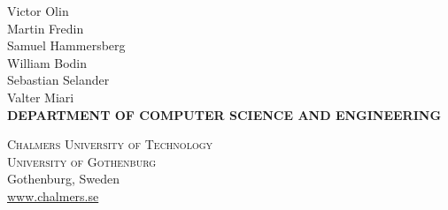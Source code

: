 \begin{titlepage}
\noindent
{\Large
    Victor Olin\\[2mm]
    Martin Fredin\\[2mm]
    Samuel Hammersberg\\[2mm]
    William Bodin\\[2mm]
    Sebastian Selander\\[2mm]
    Valter Miari}\setlength{\parskip}{0.5cm}\\

\noindent
\textcolor{thesisHeaderColor}{\small\textbf{DEPARTMENT OF COMPUTER SCIENCE AND ENGINEERING}}
\setlength{\parskip}{1mm}

\textsc{Chalmers University of Technology} \\
\textsc{University of Gothenburg} \\
{\small Gothenburg, Sweden \the\year \\
\href{www.chalmers.se}{www.chalmers.se}}\vspace{1.2cm}

\renewcommand{\familydefault}{\rmdefault} \normalfont %
\end{titlepage}


\newpage
\restoregeometry
\thispagestyle{empty}
\mbox{}


